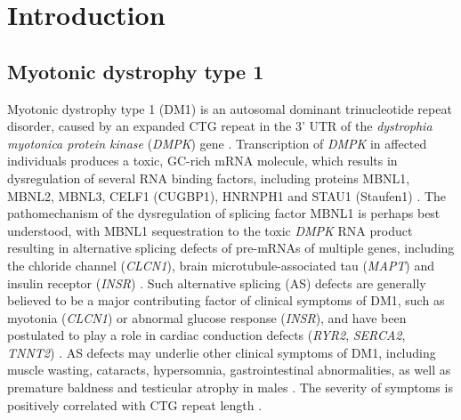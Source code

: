\documentclass[10pt,letterpaper]{article}
\begin{document}

\linenumbers

\section*{Introduction}

\subsection*{Myotonic dystrophy type 1}

Myotonic dystrophy type 1 (DM1) is an autosomal dominant trinucleotide repeat disorder, caused by an expanded CTG repeat in the 3' UTR of the {\it dystrophia myotonica protein kinase} ({\it DMPK}) gene \cite{Brook1992}. Transcription of {\it DMPK} in affected individuals produces a toxic, GC-rich mRNA molecule, which results in dysregulation of several RNA binding factors, including proteins MBNL1, MBNL2, MBNL3, CELF1 (CUGBP1), HNRNPH1 and STAU1 (Staufen1) \cite{Meola2015, Thornton2014}. The pathomechanism of the dysregulation of splicing factor MBNL1 is perhaps best understood, with MBNL1 sequestration to the toxic {\it DMPK} RNA product resulting in alternative splicing defects of pre-mRNAs of multiple genes, including the chloride channel ({\it CLCN1}), brain microtubule-associated
tau ({\it MAPT}) and insulin receptor ({\it INSR}) \cite{Holt2009}. Such alternative splicing (AS) defects are generally believed to be a major contributing factor of clinical symptoms of DM1, such as myotonia ({\it CLCN1}) or abnormal glucose response ({\it INSR}), and have been postulated to play a role in cardiac conduction defects ({\it RYR2}, {\it SERCA2}, {\it TNNT2}) \cite{Cudia2009}. AS defects may underlie other clinical symptoms of DM1, including muscle wasting, cataracts, hypersomnia, gastrointestinal abnormalities, as well as premature baldness and testicular atrophy in males \cite{Meola2015, Udd2012}. The severity of symptoms is positively correlated with CTG repeat length \cite{Meola2015}.
\end{document}
